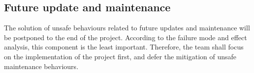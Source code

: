 \documentclass{article}
\begin{document}
\subsection{Future update and maintenance}
The solution of unsafe behaviours related to future updates and maintenance will
be postponed to the end of the project. According to the failure mode and effect
analysis, this component is the least important. Therefore, the team shall focus
on the implementation of the project first, and defer the mitigation of unsafe
maintenance behaviours.
\end{document}
